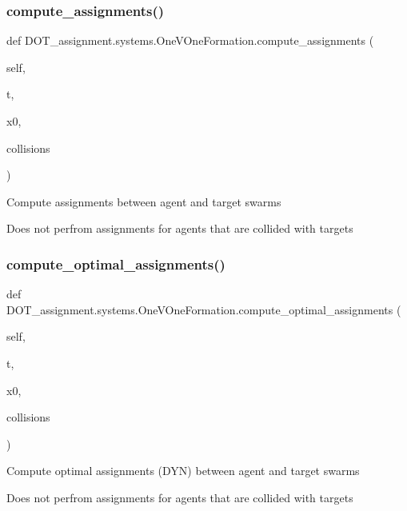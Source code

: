 \subsubsection{\texorpdfstring{compute\_assignments()}{compute\_assignments()}}
{\footnotesize\ttfamily def D\+O\+T\+\_\+assignment.\+systems.\+One\+V\+One\+Formation.\+compute\+\_\+assignments (\begin{DoxyParamCaption}\item[{}]{self,  }\item[{}]{t,  }\item[{}]{x0,  }\item[{}]{collisions }\end{DoxyParamCaption})}

\begin{DoxyVerb}Compute assignments between agent and target swarms

Does not perfrom assignments for agents that are collided with targets\end{DoxyVerb}
 \mbox{\label{class_d_o_t__assignment_1_1systems_1_1_one_v_one_formation_a21bf23aedfd8d209675e89a88c99232d}} 
\subsubsection{\texorpdfstring{compute\_optimal\_assignments()}{compute\_optimal\_assignments()}}
{\footnotesize\ttfamily def D\+O\+T\+\_\+assignment.\+systems.\+One\+V\+One\+Formation.\+compute\+\_\+optimal\+\_\+assignments (\begin{DoxyParamCaption}\item[{}]{self,  }\item[{}]{t,  }\item[{}]{x0,  }\item[{}]{collisions }\end{DoxyParamCaption})}

\begin{DoxyVerb}Compute optimal assignments (DYN) between agent and target swarms

Does not perfrom assignments for agents that are collided with targets\end{DoxyVerb}
 \mbox{\label{class_d_o_t__assignment_1_1systems_1_1_one_v_one_formation_a542849b0731610d73b57d81175b25a87}} 

